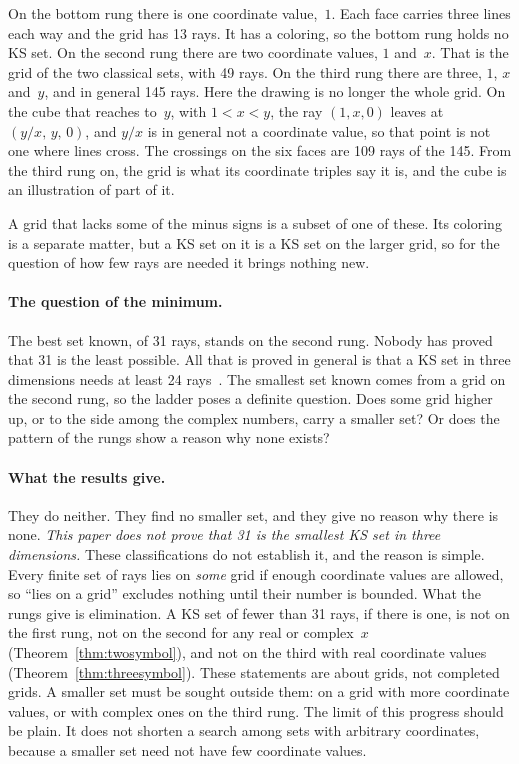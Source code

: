 On the bottom rung there is one coordinate value,~$1$.  Each face carries three lines each way
and the grid has 13 rays.  It has a coloring, so the bottom rung holds no KS set.  On the
second rung there are two coordinate values, $1$ and~$x$.  That is the grid of the two
classical sets, with 49 rays.  On the third rung there are three, $1$, $x$ and~$y$, and in
general 145 rays.  Here the drawing is no longer the whole grid.  On the cube that reaches
to~$y$, with $1<x<y$, the ray $(1,x,0)$ leaves at $(y/x,\,y,\,0)$, and $y/x$ is in general not a
coordinate value, so that point is not one where lines cross.  The crossings on the six faces
are 109 rays of the 145.  From the third rung on,
the grid is what its coordinate triples say it is, and the cube is an illustration of part of
it.

A grid that lacks some of the minus signs is a subset of one of these.  Its coloring is a
separate matter, but a KS set on it is a KS set on the larger grid, so for the question of how
few rays are needed it brings nothing new.

\paragraph{The question of the minimum.}
The best set known, of 31 rays, stands on the second rung.  Nobody has proved that 31 is the
least possible.  All that is proved in general is that a KS set in three dimensions needs at
least 24 rays~\cite{KirchwegerPeitlSzeider2023,LiBrightGanesh2024}.  The smallest set known
comes from a grid on the second rung, so the ladder poses a definite question.  Does some grid
higher up, or to the side among the complex numbers, carry a smaller set?  Or does the pattern
of the rungs show a reason why none exists?

\paragraph{What the results give.}
They do neither.  They find no smaller set, and they give no reason why there is none.
\emph{This paper does not prove that 31 is the smallest KS set in three dimensions.}  These classifications do not establish it, and the reason is simple.
Every finite set of rays lies on \emph{some} grid if enough coordinate values are allowed, so
``lies on a grid'' excludes nothing until their number is bounded.  What the rungs give is
elimination.  A KS set of fewer than 31 rays, if there is one, is not on the first rung, not
on the second for any real or complex~$x$ (Theorem~\ref{thm:twosymbol}), and not on the third
with real coordinate values (Theorem~\ref{thm:threesymbol}).  These statements are about
grids, not completed grids.  A smaller set must be sought outside them: on a grid with more
coordinate values, or with complex ones on the third rung.  The limit of this progress should
be plain.  It does not shorten a search among sets with arbitrary coordinates, because a
smaller set need not have few coordinate values.

